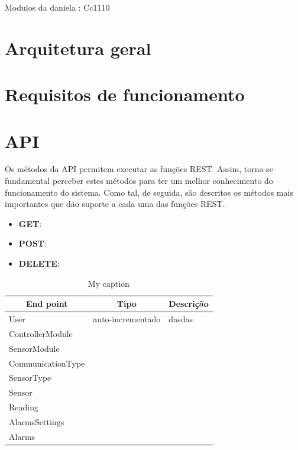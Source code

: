 Modulos da daniela : Cc1110



\section{Arquitetura geral}




\newpage









\section{Requisitos de funcionamento}


\newpage


\section{API}

Os métodos da API permitem executar as funções REST. Assim, torna-se fundamental perceber estes métodos para ter um melhor conhecimento do funcionamento do sistema. Como tal, de seguida, são descritos os métodos mais importantes que dão suporte a cada uma das funções REST.

\begin{itemize}
	\item \textbf{GET}: 
	\item \textbf{POST}: 
	\item \textbf{DELETE}: 
\end{itemize}





\begin{table}[h]
	\centering
	\begin{tabular}{|l|l|l|}
		\hline
		\multicolumn{1}{|c|}{\textbf{End point}} & \multicolumn{1}{c|}{\textbf{Tipo}} & \multicolumn{1}{c|}{\textbf{Descrição}} \\ \hline
		User & auto-incrementado & dasdas \\ \hline
		ControllerModule&  &  \\ \hline
		SensorModule&  &  \\ \hline
		CommunicationType&  &  \\ \hline
		SensorType&  &  \\ \hline
		Sensor&  &  \\ \hline
		Reading&  &  \\ \hline
		AlarmsSettings&  &  \\ \hline
		Alarms&  &  \\ \hline
	\end{tabular}
	\caption{My caption}
	\label{my-label}
\end{table}






